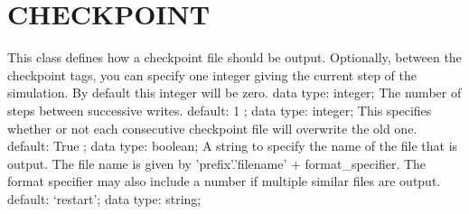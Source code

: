 \section{CHECKPOINT}
\label{CHECKPOINT}
\begin{ipifield}{}%
{This class defines how a checkpoint file should be output. Optionally, between the checkpoint tags, you can specify one integer giving the current step of the simulation. By default this integer will be zero.}%
{data type: integer; }%
{%
{The number of steps between successive writes.}%
{default:  1 ; data type: integer; }%
%
{This specifies whether or not each consecutive checkpoint file will overwrite the old one.}%
{default:  True ; data type: boolean; }%
%
{A string to specify the name of the file that is output. The file name is given by 'prefix'.'filename' + format\_specifier. The format specifier may also include a number if multiple similar files are output.}%
{default: `restart'; data type: string; }%
}
\end{ipifield}
